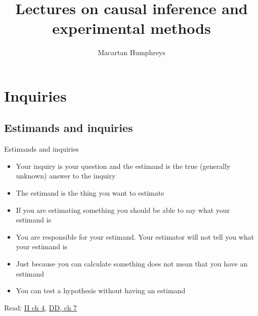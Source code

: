 \documentclass[
  11pt,
  ignorenonframetext,
]{beamer}
\title{Lectures on causal inference and experimental methods}
\author{Macartan Humphreys}
\date{}
\providecommand{\tightlist}{%
  \setlength{\itemsep}{0pt}\setlength{\parskip}{0pt}}\usepackage{longtable,booktabs,array}
\begin{document}
\frame{\titlepage}
\ifdefined\Shaded\renewenvironment{Shaded}{\begin{tcolorbox}[interior hidden, frame hidden, borderline west={3pt}{0pt}{shadecolor}, sharp corners, boxrule=0pt, enhanced, breakable]}{\end{tcolorbox}}\fi

\hypertarget{inquiries}{%
\section{\texorpdfstring{Inquiries
\label{estimands}}{Inquiries }}\label{inquiries}}

\hypertarget{estimands-and-inquiries}{%
\subsection{Estimands and inquiries}\label{estimands-and-inquiries}}

\begin{frame}{Estimands and inquiries}
\begin{itemize}
\tightlist
\item
  Your inquiry is your question and the estimand is the true (generally
  unknown) answer to the inquiry
\item
  The estimand is the thing you want to estimate
\item
  If you are estimating something you should be able to say what your
  estimand is
\item
  You are responsible for your estimand. Your estimator will not tell
  you what your estimand is
\item
  Just because you can calculate something does not mean that you have
  an estimand
\item
  You can test a hypothesis without having an estimand
\end{itemize}

Read:
\href{https://macartan.github.io/integrated_inferences/HJC4.html}{II ch
4},
\href{https://book.declaredesign.org/declaration-diagnosis-redesign/defining-inquiry.html}{DD,
ch 7}
\end{frame}
\end{document}
